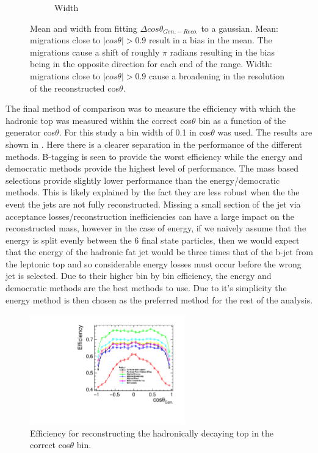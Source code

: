 \begin{figure}
\begin{subfigure}{.5\textwidth}
    \caption[Width]{Width}
  \end{subfigure}
  \caption[Mean and width from fitting $\Delta cos\theta_{Gen.-Reco.}$ to a gaussian]{Mean and width from fitting $\Delta cos\theta_{Gen.-Reco.}$ to a gaussian. Mean: migrations close to $\mid cos\theta\mid>0.9$ result in a bias in the mean. The migrations cause a shift of roughly $\pi$ radians resulting in the bias being in the opposite direction for each end of the range. Width: migrations close to $\mid cos\theta\mid>0.9$ cause a broadening in the resolution of the reconstructed cos$\theta$.}
  \label{fig:angleFitDiff}
\end{figure}

The final method of comparison was to measure the efficiency with which the hadronic top was measured within the correct cos$\theta$ bin as a function of the generator cos$\theta$. For this study a bin width of 0.1 in cos$\theta$ was used. The results are shown in . Here there is a clearer separation in the performance of the different methods. B-tagging is seen to provide the worst efficiency while the energy and democratic methods provide the highest level of performance. The mass based selections provide slightly lower performance than the energy/democratic methods. This is likely explained by the fact they are less robust when the the event the jets are not fully reconstructed. Missing a small section of the jet via acceptance losses/reconstruction inefficiencies can have a large impact on the reconstructed mass, however in the case of energy, if we naively assume that the energy is split evenly between the 6 final state particles, then we would expect that the energy of the hadronic fat jet would be three times that of the b-jet from the leptonic top and so considerable energy losses must occur before the wrong jet is selected. Due to their higher bin by bin efficiency, the energy and democratic methods are the best methods to use. Due to it's simplicity the energy method is then chosen as the preferred method for the rest of the analysis. 

\begin{figure}
  \centering
  \includegraphics[width=0.6\textwidth]{TopAnalysis/figures/EfficiencyvsMCTheta.pdf}
  \caption[Efficiency for reconstructing the hadronically decaying top in the correct cos$\theta$ bin]{Efficiency for reconstructing the hadronically decaying top in the correct cos$\theta$ bin.}
  \label{fig:angularEfficiency}
\end{figure}


